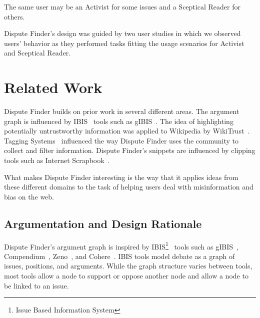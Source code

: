 \documentclass{www2010-submission}
\newcommand{\todo}[1]{}
\begin{document}
The same user may be an Activist for some issues and a Sceptical Reader for others.



\todo{Claim panel should have 'more' buttons}

Dispute Finder's design was guided by two user studies in which we observed users' behavior as they performed tasks fitting the usage scenarios for Activist and Sceptical Reader.

\todo{Talk about automatically including all arguments from Snopes}
\todo{I think we need to do some kind of evaluation of the new interface, even if it is just showing it to some people, or having people in the lab try it.}
\todo{Need figures saying how efficient it is for an activist user to mark up a topic}



\section{Related Work}
\todo{Don't cite things that aren't relevant}

Dispute Finder builds on prior work in several different areas. The argument graph is influenced by IBIS~\cite{Rittel1973} tools such as gIBIS~\cite{Conklin1987a}. 
The idea of highlighting potentially untrustworthy information was applied to Wikipedia by WikiTrust~\cite{Adler2008a}. Tagging Systems~\cite{Marlow2006} influenced the way Dispute Finder uses the community to collect and filter information. Dispute Finder's snippets are influenced by clipping tools such as Internet Scrapbook~\cite{Sugiura1998}.

What makes Dispute Finder interesting is the way that it applies ideas from these different domains to the task of helping users deal with misinformation and bias on the web.

\subsection{Argumentation and Design Rationale}

Dispute Finder's argument graph is inspired by IBIS\footnote{Issue Based Information System}~\cite{Rittel1973} tools such as gIBIS~\cite{Conklin1987a}, Compendium~\cite{Selvin2001}, Zeno~\cite{Gordon1997}, and Cohere~\cite{Shum2008}. IBIS tools model debate as a graph of issues, positions, and arguments. While the graph structure varies between tools, most tools allow a node to support or oppose another node and allow a node to be linked to an issue. 
\end{document}
